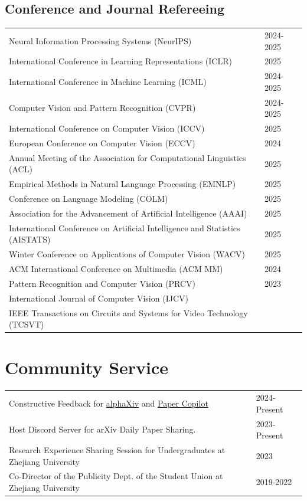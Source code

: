 \documentclass[a4paper,11pt]{article}
\newcommand{\sepspace}{\vspace{6pt}}
\begin{document}
\subsection*{Conference and Journal Refereeing}
\begin{tabular}{p{14cm}@{\hspace{1em}}!{\textcolor{lightgray}{\vrule width 0.5pt}}@{\hspace{1em}}l}
    Neural Information Processing Systems (NeurIPS) & 2024-2025 \\
    International Conference in Learning Representations (ICLR) & 2025 \\
    International Conference in Machine Learning (ICML) & 2024-2025 \\
    Computer Vision and Pattern Recognition (CVPR) & 2024-2025 \\
    International Conference on Computer Vision (ICCV) & 2025 \\
    European Conference on Computer Vision (ECCV) & 2024 \\
    Annual Meeting of the Association for Computational Linguistics (ACL) & 2025 \\
    Empirical Methods in Natural Language Processing (EMNLP) & 2025 \\
    Conference on Language Modeling (COLM) & 2025 \\
    Association for the Advancement of Artificial Intelligence (AAAI) & 2025 \\
    International Conference on Artificial Intelligence and Statistics (AISTATS) & 2025 \\
    Winter Conference on Applications of Computer Vision (WACV) & 2025 \\
    ACM International Conference on Multimedia (ACM MM) & 2024 \\
    Pattern Recognition and Computer Vision (PRCV) & 2023 \\ 
    International Journal of Computer Vision (IJCV) &  \\
    IEEE Transactions on Circuits and Systems for Video Technology (TCSVT) &  \\    
\end{tabular}

\sepspace
\section*{Community Service}
\begin{tabular}{p{14cm}@{\hspace{1em}}!{\textcolor{lightgray}{\vrule width 0.5pt}}@{\hspace{1em}}l}
    Constructive Feedback for \textcolor{linkpink}{\href{https://www.alphaxiv.org/}{alphaXiv}} and \textcolor{linkpink}{\href{https://papercopilot.com/}{Paper Copilot}} & 2024-Present \\
    Host Discord Server for arXiv Daily Paper Sharing. & 2023-Present \\
    Research Experience Sharing Session for Undergraduates at Zhejiang University & 2023 \\
    Co-Director of the Publicity Dept. of the Student Union at Zhejiang University & 2019-2022 \\
\end{tabular}
\end{document}
